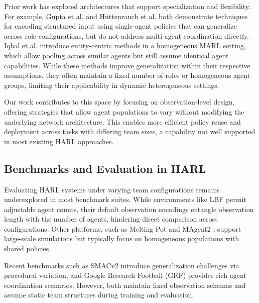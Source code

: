 \documentclass{article}
\begin{document}
        Prior work has explored architectures that support specialization and flexibility. 
        For example, Gupta et al. \cite{gupta2017a} and Hüttenrauch et al. \cite{huttenrauch2019} 
        both demonstrate techniques for encoding structured input using single-agent policies that 
        can generalize across role configurations, but do not address multi-agent coordination directly. 
        Iqbal et al. \cite{iqbal2021} introduce entity-centric methods in a homogeneous MARL setting, 
        which allow pooling across similar agents but still assume identical agent capabilities. 
        While these methods improve generalization within their respective assumptions, they often 
        maintain a fixed number of roles or homogeneous agent groups, limiting their applicability 
        in dynamic heterogeneous settings.
        
        Our work contributes to this space by focusing on observation-level design, offering strategies
        that allow agent populations to vary without modifying the underlying network architecture.
        This enables more efficient policy reuse and deployment across tasks with differing team sizes,
        a capability not well supported in most existing HARL approaches.
        
        \subsection{Benchmarks and Evaluation in HARL}
        
        Evaluating HARL systems under varying team configurations remains underexplored in most
        benchmark suites. While environments like LBF \cite{papoudakis2021} permit adjustable agent counts,
        their default observation encodings entangle observation length with the number of agents,
        hindering direct comparison across configurations. Other platforms, such as Melting Pot
        \cite{leibo2021} and MAgent2 \cite{zheng2017}, support large-scale simulations but typically focus
        on homogeneous populations with shared policies.
        
        Recent benchmarks such as SMACv2 \cite{ellis2023} introduce generalization challenges via
        procedural variation, and Google Research Football (GRF) \cite{kurach2020} provides rich agent
        coordination scenarios. However, both maintain fixed observation schemas and assume static team
        structures during training and evaluation.
        
\end{document}
